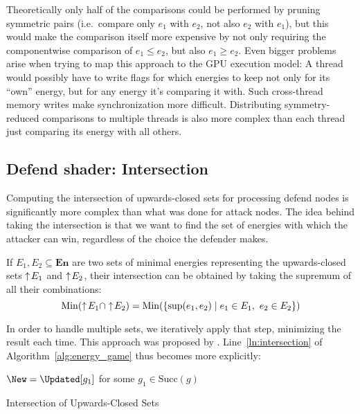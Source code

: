 Theoretically only half of the comparisons could be performed by pruning symmetric
pairs (i.e.\ compare only $e_1$ with $e_2$, not also $e_2$ with $e_1$),
but this would make the comparison itself more expensive by not only requiring
the componentwise comparison of $e_1 \leq e_2$, but also $e_1 \geq e_2$.
Even bigger problems arise when trying to map this approach to the GPU
execution model:
A thread would possibly have to write flags for which energies to keep not only
for its \enquote{own} energy,
but for any energy it's comparing it with.
Such cross-thread memory writes make synchronization more difficult.
Distributing symmetry-reduced comparisons to multiple threads is also
more complex than each thread just comparing its energy with all others.


\subsection{Defend shader: Intersection}\label{subsec:defend_shader}

Computing the intersection of upwards-closed sets for processing defend nodes
is significantly more complex than what was done for attack nodes.
The idea behind taking the intersection is that we want to find the set of
energies with which the attacker can win,
regardless of the choice the defender makes.

If $E_1, E_2 \subseteq \mathbf{En}$ are two sets of minimal energies
representing the upwards-closed sets $\uparrow\! E_1$ and $\uparrow\! E_2$,
their intersection can be obtained by taking the supremum of all their combinations:
\begin{equation*}
    \mathrm{Min} (\uparrow\! E_1 \cap \uparrow\! E_2 ) =
    \mathrm{Min} (\{ \sup(e_1, e_2) \mid e_1 \in E_1,\ e_2 \in E_2 \})
\end{equation*}

In order to handle multiple sets, we iteratively apply that step,
minimizing the result each time.
This approach was proposed by \textcite{brihaye2023multi}.
Line~\ref{ln:intersection} of Algorithm~\ref{alg:energy_game}
thus becomes more explicitly:

\begin{algorithm}[H]\label{alg:intersection}
    \DontPrintSemicolon

    $\New = \Updated[g_1]$ for some $g_1 \in \mathrm{Succ}(g)$\;

    \caption{Intersection of Upwards-Closed Sets}
\end{algorithm}

